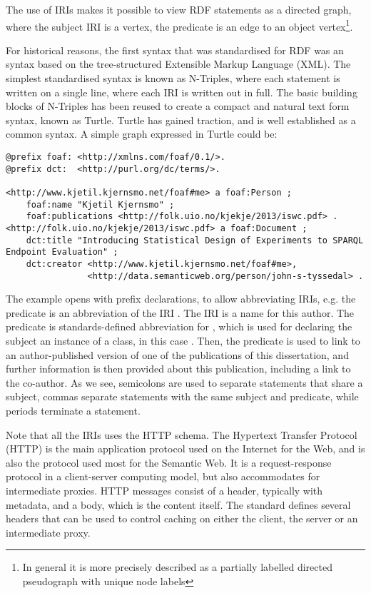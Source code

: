 The use of IRIs makes it possible to view RDF statements as a directed
graph, where the subject IRI is a vertex, the predicate is an edge to
an object vertex\footnote{In general it is more precisely described as a
  partially labelled directed pseudograph with unique node labels}.

For historical reasons, the first syntax that was standardised for RDF
was an syntax based on the tree-structured Extensible Markup Language
(XML). The simplest standardised syntax is known as N-Triples, where
each statement is written on a single line, where each IRI is written
out in full. The basic building blocks of N-Triples has been reused to
create a compact and natural text form syntax, known as Turtle. Turtle
has gained traction, and is well established as a common syntax. A
simple graph expressed in Turtle could be:

\begin{verbatim}
@prefix foaf: <http://xmlns.com/foaf/0.1/>.
@prefix dct:  <http://purl.org/dc/terms/>.

<http://www.kjetil.kjernsmo.net/foaf#me> a foaf:Person ;
    foaf:name "Kjetil Kjernsmo" ;
    foaf:publications <http://folk.uio.no/kjekje/2013/iswc.pdf> .
<http://folk.uio.no/kjekje/2013/iswc.pdf> a foaf:Document ;
    dct:title "Introducing Statistical Design of Experiments to SPARQL Endpoint Evaluation" ; 
    dct:creator <http://www.kjetil.kjernsmo.net/foaf#me>, 
                <http://data.semanticweb.org/person/john-s-tyssedal> .
\end{verbatim}

The example opens with prefix declarations, to allow abbreviating
IRIs, e.g. the predicate  is an abbreviation of the
IRI . The IRI
 is a name for this
author. The  predicate is standards-defined abbreviation
for , which
is used for declaring the subject an instance of a class, in this case
. Then, the  predicate
is used to link to an author-published version of one of the
publications of this dissertation, and further information is then
provided about this publication, including a link to the co-author. As
we see, semicolons are used to separate statements that share a
subject, commas separate statements with the same subject and
predicate, while periods terminate a statement. 

Note that all the IRIs uses the HTTP schema. The Hypertext Transfer
Protocol (HTTP) is the main application protocol used on the Internet
for the Web, and is also the protocol used most for the Semantic
Web. It is a request-response protocol in a client-server computing
model, but also accommodates for intermediate proxies. HTTP messages
consist of a header, typically with metadata, and a body, which is the
content itself. The standard defines several headers that can be used
to control caching on either the client, the server or an intermediate
proxy.

